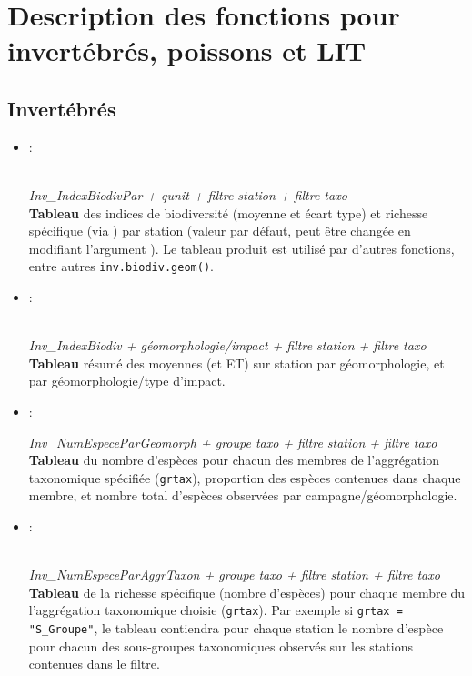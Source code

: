 \documentclass{article}
\begin{document}
\section{Description des fonctions pour invertébrés, poissons et LIT}
\subsection{Invertébrés}
\label{test}
\begin{itemize}

  \item[] \hypertarget{i1}{:} \\
    \emph{Inv\_IndexBiodivPar + qunit + filtre station + filtre taxo} \\
  \textbf{Tableau} des indices de biodiversité (moyenne et écart type)
  et richesse spécifique (via ) par station (valeur par défaut, peut être
  changée en modifiant l'argument ). Le tableau produit
  est utilisé par d'autres fonctions, entre autres \texttt{inv.biodiv.geom()}.

  \item[] \hypertarget{i2}{:}\\
    \emph{Inv\_IndexBiodiv + géomorphologie/impact + filtre station + filtre taxo}\\
    \textbf{Tableau} résumé des moyennes (et ET) sur station par
    géomorphologie, et par géomorphologie/type d'impact.

  \item[] \hypertarget{i3}{:}
    \emph{Inv\_NumEspeceParGeomorph + groupe taxo + filtre station +
      filtre taxo} \\
    \textbf{Tableau} du nombre d'espèces pour chacun des membres de
    l'aggrégation taxonomique spécifiée (\texttt{grtax}), proportion
    des espèces contenues dans chaque membre, et nombre total
    d'espèces observées par campagne/géomorphologie.

  \item[] \hypertarget{i4}{:}\\
    \emph{Inv\_NumEspeceParAggrTaxon + groupe taxo + filtre station + filtre taxo} \\
    \textbf{Tableau} de la richesse spécifique (nombre d'espèces) pour
 chaque membre du l'aggrégation taxonomique choisie
    (\texttt{grtax}). Par exemple si \texttt{grtax = "S\_Groupe"}, le
    tableau contiendra pour chaque station le nombre d'espèce pour
    chacun des sous-groupes taxonomiques observés sur les stations
    contenues dans le filtre.


\end{itemize}
\end{document}
